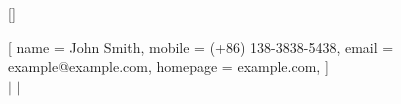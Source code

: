 \addtolength{\oddsidemargin}{-0.5in}
\addtolength{\evensidemargin}{-0.5in}
\addtolength{\textwidth}{1in}
\addtolength{\topmargin}{-.5in}
\addtolength{\textheight}{1.0in}

\raggedbottom
\raggedright

\setlength{\tabcolsep}{0in}

\titleformat{\section}{
  \resumeStyleSectionPaddingBefore\scshape\raggedright\large
}{}{0em}{}[\titlerule]



\renewcommand{\labelitemii}{
    $\vcenter{\hbox{\tiny$\bullet$}}$
}

\newkeycommand{\resumeHeading}[
        name = John Smith,
        mobile = (+86) 138-3838-5438,
        email = example@example.com,
        homepage = example.com,
]{
    \newpage \textbf{\Huge {}}
    \\ \vspace{0.1em} \small {}
    $|$ \href{mailto:\commandkey{email}}{\underline{}}
    $|$ \href{https://\commandkey{homepage}}{\underline{}}
    \vspace{0.8em}
}

\newenvironment{resumeSection}[1]{
    \resumeStyleSectionPaddingBefore
    \section{#1}
    \begin{itemize}[leftmargin=0.007\textwidth, label={}]
}{
    \end{itemize}
    \resumeStyleSectionPaddingAfter
}

